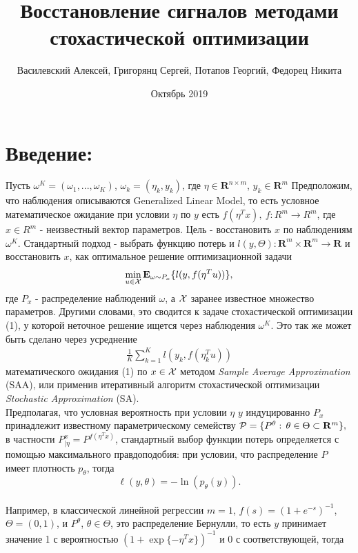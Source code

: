 \documentclass[11pt]{article}
\title{Восстановление сигналов методами стохастической оптимизации}
\author{Василевский Алексей, Григорянц Сергей, Потапов Георгий, Федорец Никита}
\date{Октябрь 2019}
\def\bR{{\mathbf{R}}}
\def\cP{{\cal P}}
\begin{document}
\maketitle

\section{Введение:}

Пусть $\omega^K=(\omega_1, ..., \omega_K)$, $\omega_k=(\eta_k, y_k)$, где $\eta\in \mathbf{R}^{n\times m}$, $y_k\in \mathbf{R}^{m}$
Предположим, что наблюдения описываются Generalized Linear Model, то есть условное математическое ожидание при условии $\eta$ по $y$ есть $f(\eta^Tx),\ f:R^m\rightarrow R^m$, где $x\in R^m$ -
неизвестный вектор параметров.
Цель - восстановить $x$ по наблюдениям $\omega^K$. Стандартный подход - выбрать функцию потерь и $l(y, \Theta):\mathbf{R}^m\times \mathbf{R}^m\rightarrow \mathbf{R}$ и восстановить $x$, как оптимальное решение оптимизационной задачи
\begin{eqnarray}
\min_{u\in\cal X}\mathbf{E}_{\omega\sim P_x}\{l(y,f(\eta^T u))\},
  \label{1}
\end{eqnarray}
где $P_x$ - распределение наблюдений $\omega$, а $\cal X$ заранее известное множество параметров. Другими словами, это сводится к задаче стохастической оптимизации (1), у которой неточное решение ищется через наблюдения $\omega^K$.
Это так же может быть сделано через усреднение
\begin{eqnarray}
  \frac{1}{K}\sum_{k=1}^{K}l(y_k,f(\eta_k^T u))
    \label{2}
  \end{eqnarray}
математического ожидания (1) по $x\in \cal{X}$ методом {\em Sample Average Approximation} (SAA),
или применив итеративный алгоритм стохастической оптимизации {\em Stochastic Approximation} (SA).\\
Предполагая, что условная вероятность при условии $\eta$ $y$ индуцированно $P_x$ принадлежит известному параметрическому семейству 
$\cP=\{P^\theta:\,
\theta\in \Theta\subset\bR^m\},$
в частности $P_{|\eta}^x=P^{f(\eta^Tx)}$, стандартный выбор функции потерь определяется с помощью максимального правдоподобия: при условии, что распределение $P$ имеет плотность $p_\theta$, тогда
$$
\ell(y,\theta)=-\ln(p_\theta(y)).
$$\\
Например, в классической линейной регрессии $m=1$, $f(s)=(1+e^{-s})^{-1}$, $\Theta =(0,1)$, и
$P^{\theta}$, $\theta \in \Theta$, это распределение Бернулли, то есть $y$ принимает значение 1 с
вероятностью $(1+\exp\{-\eta^T x\})^{-1}$ и 0 с соответствующей, тогда
\end{document}
